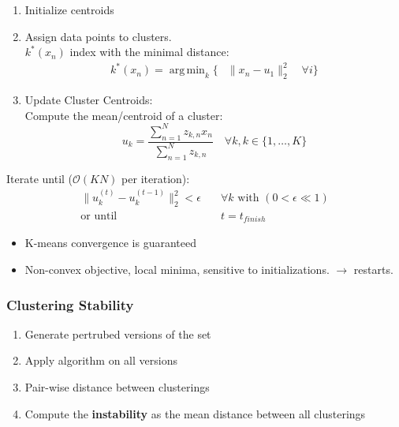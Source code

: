 \documentclass[a4paper,landscape,10pt]{article}
\newlength{\wideitemsep}
\let\olditem\item
\renewcommand{\item}{\setlength{\itemsep}{\wideitemsep}\olditem}
\renewcommand*{\O}[0] {\ensuremath{\mathcal{O}}}
\DeclareMathOperator*{\argmin}{arg\,min}
\begin{document}
\begin{multicols}{4}
\begin{enumerate}
    \item Initialize centroids
    \item Assign data points to clusters. \\
            $k^*(x_n)$ index with the minimal distance:
            \begin{equation*}
            \begin{split}
                k^*(x_n) = \argmin_{k} \big\{ &\|x_n - u_1 \|_2^2 \quad \forall
                i \big\}
            \end{split}
            \end{equation*}
    \item Update Cluster Centroids: \\
            Compute the mean/centroid of a cluster:
            \[
                u_k = \frac{\sum_{n=1}^N z_{k,n}x_n}{\sum_{n=1}^N z_{k,n}} \quad
                \forall k, k \in \{1, \ldots, K \}
            \]
\end{enumerate}
Iterate until ($\O(KN)$ per iteration):
\begin{equation*}
\begin{split}
    \| u_k^{(t)} - u_k^{(t-1)} \|_2^2 < \epsilon \quad &\forall k \text{ with }
    (0 < \epsilon \ll 1) \\
   \text{or until } &t = t_{finish}
\end{split}
\end{equation*}

\begin{itemize}
    \item K-means convergence is guaranteed
    \item Non-convex objective, local minima, sensitive to initializations.
    $\rightarrow$ restarts.
\end{itemize}

\subsubsection{Clustering Stability}
\begin{enumerate}
    \item Generate pertrubed versions of the set
    \item Apply algorithm on all versions
    \item Pair-wise distance between clusterings
    \item Compute the {\bf instability} as the mean distance between all
    clusterings
\end{enumerate}


\end{multicols}
\end{document}
